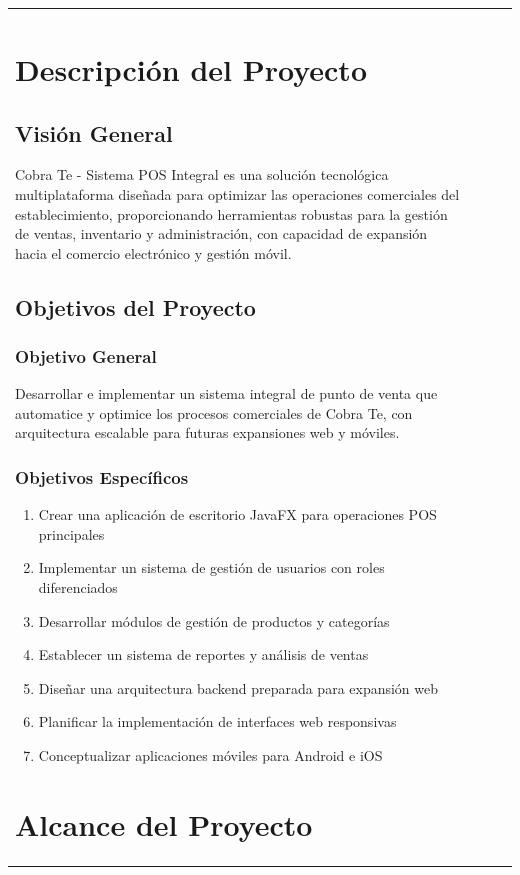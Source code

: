\documentclass[12pt,letterpaper]{article}
\begin{document}
\begin{longtable}{|p{3cm}|p{2cm}|p{4cm}|p{6cm}|}
\section{Descripción del Proyecto}

\subsection{Visión General}
Cobra Te - Sistema POS Integral es una solución tecnológica multiplataforma diseñada para optimizar las operaciones comerciales del establecimiento, proporcionando herramientas robustas para la gestión de ventas, inventario y administración, con capacidad de expansión hacia el comercio electrónico y gestión móvil.

\subsection{Objetivos del Proyecto}

\subsubsection{Objetivo General}
Desarrollar e implementar un sistema integral de punto de venta que automatice y optimice los procesos comerciales de Cobra Te, con arquitectura escalable para futuras expansiones web y móviles.

\subsubsection{Objetivos Específicos}
\begin{enumerate}
    \item Crear una aplicación de escritorio JavaFX para operaciones POS principales
    \item Implementar un sistema de gestión de usuarios con roles diferenciados
    \item Desarrollar módulos de gestión de productos y categorías
    \item Establecer un sistema de reportes y análisis de ventas
    \item Diseñar una arquitectura backend preparada para expansión web
    \item Planificar la implementación de interfaces web responsivas
    \item Conceptualizar aplicaciones móviles para Android e iOS
\end{enumerate}

\section{Alcance del Proyecto}


\end{longtable}
\end{document}
